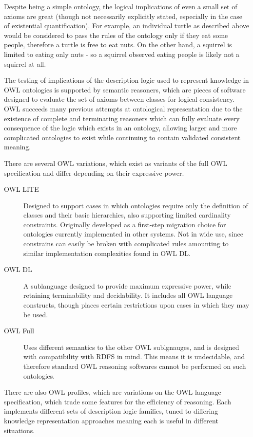 \documentclass{article}
\begin{document}
Despite being a simple ontology, the logical implications of even a small set of
axioms are great (though not necessarily explicitly stated, especially in the
case of existential quantification). For example, an individual turtle as described 
above would be considered to pass the rules of the ontology only if they eat some 
people, therefore a turtle is free to eat nuts. On the other hand, a squirrel is limited
to eating only nuts - so a squirrel observed eating people is likely not a
squirrel at all.

The testing of implications of the description logic used to represent
knowledge in OWL ontologies is supported by semantic reasoners, which are 
pieces of software designed to evaluate the set of axioms between classes for 
logical consistency. OWL succeeds many previous attempts at ontological 
representation due to the existence of complete and terminating reasoners 
which can fully evaluate every consequence of the logic which exists in an 
ontology, allowing larger and more complicated ontologies to exist while 
continuing to contain validated consistent meaning.

There are several OWL variations, which exist as variants of the full OWL
specification and differ depending on their expressive power.

\begin{description}
    \item[OWL LITE] Designed to support cases in which ontologies require only
    the definition of classes and their basic hierarchies, also supporting
    limited cardinality constraints. Originally developed as a first-step
    migration choice for ontologies currently implemented in other systems. Not
    in wide use, since constrains can easily be broken with complicated rules
    amounting to similar implementation complexities found in OWL DL.
    \item[OWL DL] A sublanguage designed to provide maximum expressive power,
    while retaining terminability and decidability. It includes all OWL language
    constructs, though places certain restrictions upon cases in which they may
    be used. 
    \item[OWL Full] Uses different semantics to the other OWL sublgnauges, and
    is designed with compatibility with RDFS in mind. This means it is
    undecidable, and therefore standard OWL reasoning softwares cannot be
    performed on such ontologies.
\end{description}

There are also OWL profiles\cite{owlprofiles}, which are variations on the OWL
language specification, which trade some features for the efficiency of reasoning.
Each implements different sets of description logic families, tuned to differing
knowledge representation approaches meaning each is useful in different situations.
\end{document}
